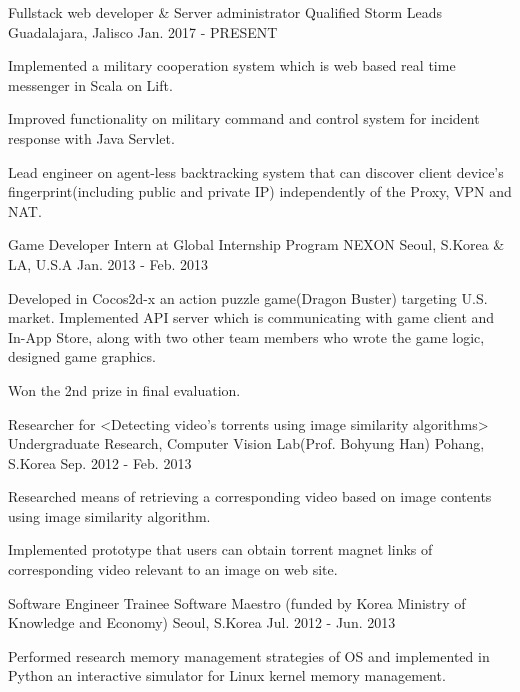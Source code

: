 \begin{cventries}
  \cventry
    {Fullstack web developer \& Server administrator}
    {Qualified Storm Leads}
    {Guadalajara, Jalisco}
    {Jan. 2017 - PRESENT}
    {
      \begin{cvitems}
        \item {Implemented a military cooperation system which is web based real time messenger in Scala on Lift.}
        \item {Improved functionality on military command and control system for incident response with Java Servlet.}
        \item {Lead engineer on agent-less backtracking system that can discover client device's fingerprint(including public and private IP) independently of the Proxy, VPN and NAT.}
      \end{cvitems}
    }
  \cventry
    {Game Developer Intern at Global Internship Program}
    {NEXON}
    {Seoul, S.Korea \& LA, U.S.A}
    {Jan. 2013 - Feb. 2013}
    {
      \begin{cvitems}
        \item {Developed in Cocos2d-x an action puzzle game(Dragon Buster) targeting U.S. market. Implemented API server which is communicating with game client and In-App Store, along with two other team members who wrote the game logic, designed game graphics.}
        \item {Won the 2nd prize in final evaluation.}
      \end{cvitems}
    }
  \cventry
    {Researcher for <Detecting video’s torrents using image similarity algorithms>}
    {Undergraduate Research, Computer Vision Lab(Prof. Bohyung Han)}
    {Pohang, S.Korea}
    {Sep. 2012 - Feb. 2013}
    {
      \begin{cvitems}
        \item {Researched means of retrieving a corresponding video based on image contents using image similarity algorithm.}
        \item {Implemented prototype that users can obtain torrent magnet links of corresponding video relevant to an image on web site.}
      \end{cvitems}
    }
  \cventry
    {Software Engineer Trainee}
    {Software Maestro (funded by Korea Ministry of Knowledge and Economy)}
    {Seoul, S.Korea}
    {Jul. 2012 - Jun. 2013}
    {
      \begin{cvitems}
        \item {Performed research memory management strategies of OS and implemented in Python an interactive simulator for Linux kernel memory management.}

\end{cvitems}}
\end{cventries}

